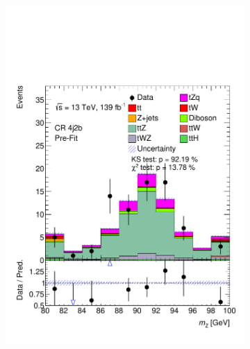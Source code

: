 \begin{figure}[!h]
\begin{subfigure}[b]{0.33\linewidth}
    \includegraphics[width=\linewidth]{ubonn-thesis/Chapters/Chapters_06/Figure/Input_distribution/CR_4j2b_MZ.pdf} 
  \end{subfigure}
  \begin{subfigure}[b]{0.33\linewidth}
    \centering

\end{subfigure}
\end{figure}
